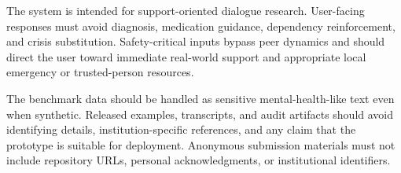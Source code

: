 The system is intended for support-oriented dialogue research. User-facing responses must avoid diagnosis, medication guidance, dependency reinforcement, and crisis substitution. Safety-critical inputs bypass peer dynamics and should direct the user toward immediate real-world support and appropriate local emergency or trusted-person resources.

The benchmark data should be handled as sensitive mental-health-like text even when synthetic. Released examples, transcripts, and audit artifacts should avoid identifying details, institution-specific references, and any claim that the prototype is suitable for deployment. Anonymous submission materials must not include repository URLs, personal acknowledgments, or institutional identifiers.
